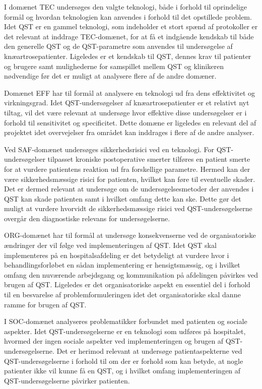 I domænet TEC undersøges den valgte teknologi, både i forhold til oprindelige formål og hvordan teknologien kan anvendes i forhold til det opstillede problem. Idet QST er en gammel teknologi, som indeholder et stort spænd af protokoller er det relevant at inddrage TEC-domænet, for at få et indgående kendskab til både den generelle QST og de QST-parametre som anvendes til undersøgelse af knæartrosepatienter. Ligeledes er et kendskab til QST, dennes krav til patienter og brugere samt mulighederne for samspillet mellem QST og klinikeren nødvendige før det er muligt at analysere flere af de andre domæner. 

Domænet EFF har til formål at analysere en teknologi ud fra dens effektivitet og virkningsgrad. Idet QST-undersøgelser af knæartrosepatienter er et relativt nyt tiltag, vil det være relevant at undersøge hvor effektive disse undersøgelser er i forhold til sensitivitet og specificitet. Dette domæne er ligeledes en relevant del af projektet idet overvejelser fra området kan inddrages i flere af de andre analyser.   

Ved SAF-domænet undersøges sikkerhedsrisici ved en teknologi. For QST-undersøgelser tilpasset kroniske postoperative smerter tilføres en patient smerte for at vurdere patientens reaktion ud fra forskellige parametre. Hermed kan der være sikkerhedsmæssige risici for patienten, hvilket kan føre til eventuelle skader. Det er dermed relevant at undersøge om de undersøgelsesmetoder der anvendes i QST kan skade patienten samt i hvilket omfang dette kan ske. Dette gør det muligt at vurdere hvorvidt de sikkerhedsmæssige risici ved QST-undersøgelserne overgår den diagnostiske relevans for undersøgelserne. 

ORG-domænet har til formål at undersøge konsekvenserne ved de organisatoriske ændringer der vil følge ved implementeringen af QST. Idet QST skal implementeres på en hospitalsafdeling er det betydeligt at vurdere hvor i behandlingsforløbet en sådan implementering er hensigtsmæssig, og i hvilket omfang den nuværende arbejdsgang og kommunikation på afdelingen påvirkes ved brugen af QST. Ligeledes er det organisatoriske aspekt en essentiel del i forhold til en besvarelse af problemformuleringen idet det organisatoriske skal danne ramme for brugen af QST.

I SOC-domænet analyseres problematikker forbundet med patienten og sociale aspekter. Idet QST-undersøgelserne er en teknologi som udføres på hospitalet, hvormed der ingen sociale aspekter ved implementeringen og brugen af QST-undersøgelserne. Det er herimod relevant at undersøge patientaspekterne ved QST-undersøgelserne i forhold til om  der er forhold som kan betyde, at nogle patienter ikke vil kunne få en QST, og i hvilket omfang implementeringen af QST-undersøgelserne påvirker patienten.

